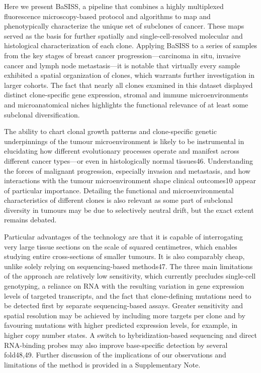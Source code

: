 Here we present BaSISS, a pipeline that combines a highly multiplexed fluorescence microscopy-based protocol and algorithms to map and phenotypically characterize the unique set of subclones of cancer. These maps served as the basis for further spatially and single-cell-resolved molecular and histological characterization of each clone. Applying BaSISS to a series of samples from the key stages of breast cancer progression—carcinoma in situ, invasive cancer and lymph node metastasis—it is notable that virtually every sample exhibited a spatial organization of clones, which warrants further investigation in larger cohorts. The fact that nearly all clones examined in this dataset displayed distinct clone-specific gene expression, stromal and immune microenvironments and microanatomical niches highlights the functional relevance of at least some subclonal diversification.

The ability to chart clonal growth patterns and clone-specific genetic underpinnings of the tumour microenvironment is likely to be instrumental in elucidating how different evolutionary processes operate and manifest across different cancer types—or even in histologically normal tissues46. Understanding the forces of malignant progression, especially invasion and metastasis, and how interactions with the tumour microenvironment shape clinical outcomes10 appear of particular importance. Detailing the functional and microenvironmental characteristics of different clones is also relevant as some part of subclonal diversity in tumours may be due to selectively neutral drift, but the exact extent remains debated.

Particular advantages of the technology are that it is capable of interrogating very large tissue sections on the scale of squared centimetres, which enables studying entire cross-sections of smaller tumours. It is also comparably cheap, unlike solely relying on sequencing-based methods47. The three main limitations of the approach are relatively low sensitivity, which currently precludes single-cell genotyping, a reliance on RNA with the resulting variation in gene expression levels of targeted transcripts, and the fact that clone-defining mutations need to be detected first by separate sequencing-based assays. Greater sensitivity and spatial resolution may be achieved by including more targets per clone and by favouring mutations with higher predicted expression levels, for example, in higher copy number states. A switch to hybridization-based sequencing and direct RNA-binding probes may also improve base-specific detection by several fold48,49. Further discussion of the implications of our observations and limitations of the method is provided in a Supplementary Note.

